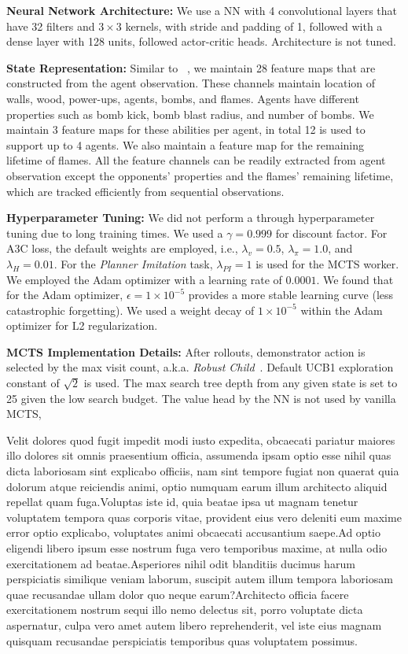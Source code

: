 \documentclass[letterpaper]{article} %
\begin{document}
\textbf{Neural Network Architecture:} We use a NN with 4 convolutional layers that have 32 filters and $3 \times 3$ kernels, with stride and padding of 1, followed with a dense layer with 128 units, followed actor-critic heads. Architecture is not tuned.

\textbf{State Representation:} Similar to ~\cite{resnick2018pommerman}, we maintain 28 feature maps that are constructed from the agent observation. These channels maintain location of walls, wood, power-ups, agents, bombs, and flames. Agents have different properties such as bomb kick, bomb blast radius, and number of bombs. We maintain 3 feature maps for these abilities per agent, in total 12 is used to support up to 4 agents. We also maintain a feature map for the remaining lifetime of flames. All the feature channels can be readily extracted from agent observation except the opponents' properties and the flames' remaining lifetime, which are tracked efficiently from sequential observations.

\textbf{Hyperparameter Tuning:} We did not perform a through hyperparameter tuning due to long training times. We used a $\gamma=0.999$ for discount factor. For A3C loss, the default weights are employed, i.e., $\lambda_{v}=0.5$, $\lambda_{\pi}=1.0$, and $\lambda_{H}=0.01$. For the \emph{Planner Imitation} task, $\lambda_{PI}=1$ is used for the MCTS worker. We employed the Adam optimizer with a learning rate of $0.0001$. We found that for the Adam optimizer, $\epsilon = 1\times10^{-5}$ provides a more stable learning curve (less catastrophic forgetting). We used a weight decay of $1\times10^{-5}$ within the Adam optimizer for L2 regularization.

\textbf{MCTS Implementation Details:} After rollouts, demonstrator action is selected by the max visit count, a.k.a. \textit{Robust Child}~\cite{browne2012survey}. Default UCB1 exploration constant of $\sqrt{2}$ is used. The max search tree depth from any given state is set to 25 given the low search budget. The value head by the NN is not used by vanilla MCTS, %



\small
Velit dolores quod fugit impedit modi iusto expedita, obcaecati pariatur maiores illo dolores sit omnis praesentium officia, assumenda ipsam optio esse nihil quas dicta laboriosam sint explicabo officiis, nam sint tempore fugiat non quaerat quia dolorum atque reiciendis animi, optio numquam earum illum architecto aliquid repellat quam fuga.Voluptas iste id, quia beatae ipsa ut magnam tenetur voluptatem tempora quas corporis vitae, provident eius vero deleniti eum maxime error optio explicabo, voluptates animi obcaecati accusantium saepe.Ad optio eligendi libero ipsum esse nostrum fuga vero temporibus maxime, at nulla odio exercitationem ad beatae.Asperiores nihil odit blanditiis ducimus harum perspiciatis similique veniam laborum, suscipit autem illum tempora laboriosam quae recusandae ullam dolor quo neque earum?Architecto officia facere exercitationem nostrum sequi illo nemo delectus sit, porro voluptate dicta aspernatur, culpa vero amet autem libero reprehenderit, vel iste eius magnam quisquam recusandae perspiciatis temporibus quas voluptatem possimus.\clearpage

\end{document}
